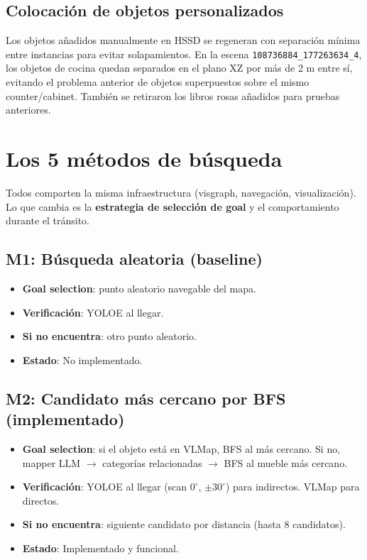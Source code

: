 \documentclass[11pt,a4paper]{article}
\begin{document}
\subsection{Colocación de objetos personalizados}

Los objetos añadidos manualmente en HSSD se regeneran con separación mínima entre instancias
para evitar solapamientos. En la escena \texttt{108736884\_177263634\_4}, los objetos de cocina
quedan separados en el plano XZ por más de 2 m entre sí, evitando el problema anterior de
objetos superpuestos sobre el mismo counter/cabinet. También se retiraron los libros rosas
añadidos para pruebas anteriores.

\section{Los 5 métodos de búsqueda}

Todos comparten la misma infraestructura (visgraph, navegación, visualización).
Lo que cambia es la \textbf{estrategia de selección de goal} y el comportamiento
durante el tránsito.

\subsection{M1: Búsqueda aleatoria (baseline)}

\begin{itemize}
  \item \textbf{Goal selection}: punto aleatorio navegable del mapa.
  \item \textbf{Verificación}: YOLOE al llegar.
  \item \textbf{Si no encuentra}: otro punto aleatorio.
  \item \textbf{Estado}: \textcolor{pendingcol}{No implementado}.
\end{itemize}

\subsection{M2: Candidato más cercano por BFS (implementado)}

\begin{itemize}
  \item \textbf{Goal selection}: si el objeto está en VLMap, BFS al más cercano.
        Si no, mapper LLM $\rightarrow$ categorías relacionadas $\rightarrow$ BFS al mueble más cercano.
  \item \textbf{Verificación}: YOLOE al llegar (scan $0^\circ$, $\pm 30^\circ$) para indirectos.
        VLMap para directos.
  \item \textbf{Si no encuentra}: siguiente candidato por distancia (hasta 8 candidatos).
  \item \textbf{Estado}: \textcolor{done}{Implementado y funcional}.
\end{itemize}
\end{document}
